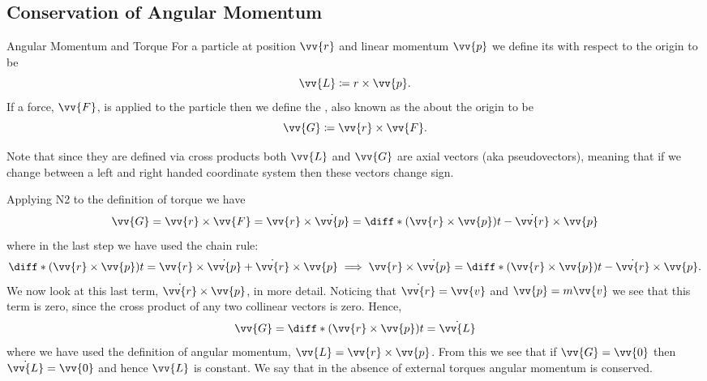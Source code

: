 \documentclass[fleqn]{NotesClass}
\begin{document}
    \subsection{Conservation of Angular Momentum}
    \begin{dfn}{Angular Momentum and Torque}{}
        For a particle at position \(\vv{r}\) and linear momentum \(\vv{p}\) we define its  with respect to the origin to be
        \begin{equation}
            \vv{L} \coloneqq r\times \vv{p}.
        \end{equation}
        If a force, \(\vv{F}\), is applied to the particle then we define the , also known as the  about the origin to be
        \begin{equation}
            \vv{G} \coloneqq \vv{r} \times \vv{F}.
        \end{equation}
    \end{dfn}
    Note that since they are defined via cross products both \(\vv{L}\) and \(\vv{G}\) are axial vectors (aka pseudovectors), meaning that if we change between a left and right handed coordinate system then these vectors change sign.
    
    Applying N2 to the definition of torque we have
    \begin{equation}
        \vv{G} = \vv{r}\times\vv{F} = \vv{r}\times\dot{\vv{p}} = \diff*{(\vv{r}\times\vv{p})}{t} - \dot{\vv{r}}\times\vv{p}
    \end{equation}
    where in the last step we have used the chain rule:
    \begin{equation}
        \diff*{(\vv{r}\times\vv{p})}{t} = \vv{r}\times\dot{\vv{p}} + \dot{\vv{r}}\times\vv{p} \implies \vv{r}\times\dot{\vv{p}} = \diff*{(\vv{r}\times\vv{p})}{t} - \dot{\vv{r}}\times\vv{p}.
    \end{equation}
    We now look at this last term, \(\dot{\vv{r}}\times\vv{p}\), in more detail.
    Noticing that \(\dot{\vv{r}} =\vv{v}\) and \(\vv{p} = m\vv{v}\) we see that this term is zero, since the cross product of any two collinear vectors is zero.
    Hence,
    \begin{equation}
        \vv{G} = \diff*{(\vv{r}\times\vv{p})}{t} = \dot{\vv{L}}
    \end{equation}
    where we have used the definition of angular momentum, \(\vv{L} = \vv{r}\times\vv{p}\).
    From this we see that if \(\vv{G} = \vv{0}\) then \(\dot{\vv{L}} = \vv{0}\) and hence \(\vv{L}\) is constant.
    We say that in the absence of external torques angular momentum is conserved.
    
\end{document}
